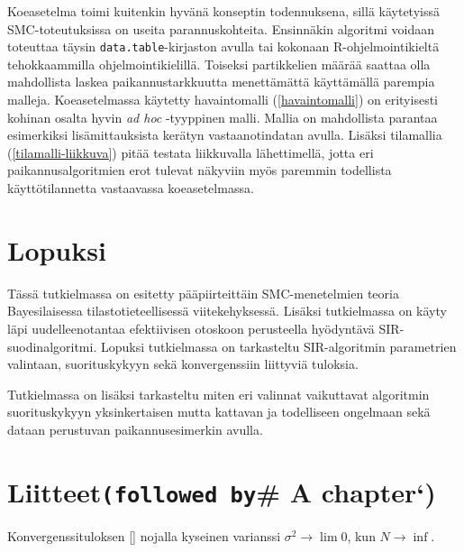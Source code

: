 \documentclass[
  12pt,
  a4paper, twoside]{book}
\begin{document}
Koeasetelma toimi kuitenkin hyvänä konseptin todennuksena, sillä käytetyissä SMC-toteutuksissa on useita parannuskohteita. Ensinnäkin algoritmi voidaan toteuttaa täysin \texttt{data.table}-kirjaston avulla tai kokonaan R-ohjelmointikieltä tehokkaammilla ohjelmointikielillä. Toiseksi partikkelien määrää saattaa olla mahdollista laskea paikannustarkkuutta menettämättä käyttämällä parempia malleja. Koeasetelmassa käytetty havaintomalli (\ref{havaintomalli}) on erityisesti kohinan osalta hyvin \textit{ad hoc} -tyyppinen malli. Mallia on mahdollista parantaa esimerkiksi lisämittauksista kerätyn vastaanotindatan avulla. Lisäksi tilamallia (\ref{tilamalli-liikkuva}) pitää testata liikkuvalla lähettimellä, jotta eri paikannusalgoritmien erot tulevat näkyviin myös paremmin todellista käyttötilannetta vastaavassa koeasetelmassa.

\hypertarget{lopuksi}{%
\chapter{Lopuksi}\label{lopuksi}}

Tässä tutkielmassa on esitetty pääpiirteittäin SMC-menetelmien teoria Bayesilaisessa tilastotieteellisessä viitekehyksessä. Lisäksi tutkielmassa on käyty läpi uudelleenotantaa efektiivisen otoskoon perusteella hyödyntävä SIR-suodinalgoritmi. Lopuksi tutkielmassa on tarkasteltu SIR-algoritmin parametrien valintaan, suorituskykyyn sekä konvergenssiin liittyviä tuloksia.

Tutkielmassa on lisäksi tarkasteltu miten eri valinnat vaikuttavat algoritmin suorituskykyyn yksinkertaisen mutta kattavan ja todelliseen ongelmaan sekä dataan perustuvan paikannusesimerkin avulla.

\hypertarget{liitteetfollowed-by-a-chapter}{%
\chapter{\texorpdfstring{Liitteet\texttt{(followed\ by}\# A chapter`)}{Liitteet(followed by\# A chapter`)}}\label{liitteetfollowed-by-a-chapter}}

Konvergenssituloksen \ref{} nojalla kyseinen varianssi \(\sigma^2 \rightarrow \lim 0\), kun \(N \rightarrow \inf\).

  
\end{document}
